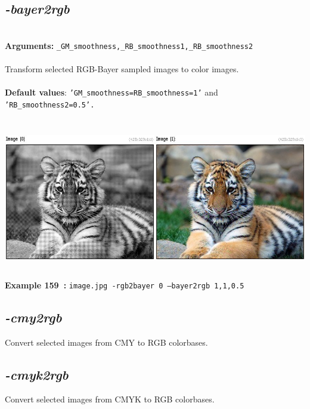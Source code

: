 \documentclass[a4paper,11pt,twoside]{book}
\begin{document}
\subsection{\emph{-bayer2rgb} }\vspace*{-0.5em}
~\\\textbf{Arguments: } 
{\small \texttt{\_GM\_smoothness,\_RB\_smoothness1,\_RB\_smoothness2}}\\~\\
Transform selected RGB-Bayer sampled images to color images.
~\\~\\\textbf{Default values}: {\small \texttt{'GM\_smoothness=RB\_smoothness=1'} and \texttt{'RB\_smoothness2=0.5'.}}
\begin{center}\includegraphics[keepaspectratio=true,height=7cm,width=\textwidth]{img/gmic_def159.jpg}\\
{\footnotesize \textbf{Example 159~:} \texttt{image.jpg -rgb2bayer 0 --bayer2rgb 1,1,0.5}}
\end{center}

\subsection{\emph{-cmy2rgb} }\vspace*{-0.5em}
Convert selected images from CMY to RGB colorbases.


\subsection{\emph{-cmyk2rgb} }\vspace*{-0.5em}
Convert selected images from CMYK to RGB colorbases.
\end{document}
